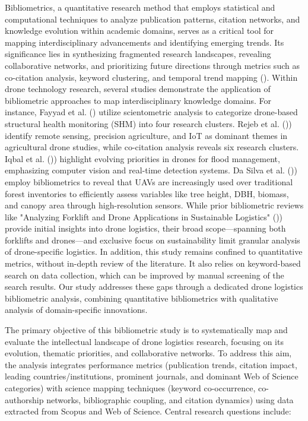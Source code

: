 \documentclass{article}
\begin{document}
Bibliometrics, a quantitative research method that employs statistical and computational techniques to analyze publication patterns, citation networks, and knowledge evolution within academic domains, serves as a critical tool for mapping interdisciplinary advancements and identifying emerging trends. Its significance lies in synthesizing fragmented research landscapes, revealing collaborative networks, and prioritizing future directions through metrics such as co-citation analysis, keyword clustering, and temporal trend mapping (\cite{WOS:000958189000001}). Within drone technology research, several studies demonstrate the application of bibliometric approaches to map interdisciplinary knowledge domains. For instance, Fayyad et al. (\cite{WOS:001229751500001}) utilize scientometric analysis to categorize drone-based structural health monitoring (SHM) into four research clusters.  Rejeb et al. (\cite{WOS:000830895100002})) identify remote sensing, precision agriculture, and IoT as dominant themes in agricultural drone studies, while co-citation analysis reveals six research clusters. Iqbal et al.  (\cite{WOS:000914960100001})) highlight evolving priorities in drones for flood management, emphasizing computer vision and real-time detection systems.  Da Silva et al.  (\cite{WOS:001366904300001})) employ bibliometrics to reveal that UAVs are increasingly used over traditional forest inventories to efficiently assess variables like tree height, DBH, biomass, and canopy area through high-resolution sensors. While prior bibliometric reviews like "Analyzing Forklift and Drone Applications in Sustainable Logistics" (\cite{WOS:001329532200078})) provide initial insights into drone logistics, their broad scope—spanning both forklifts and drones—and exclusive focus on sustainability limit granular analysis of drone-specific logistics. In addition, this study remains confined to quantitative metrics, without in-depth review of the literature. It also relies on keyword-based search on data collection, which can be improved by manual screening of the search results. Our study addresses these gaps through a dedicated drone logistics bibliometric analysis, combining quantitative bibliometrics with qualitative analysis of domain-specific innovations. 

The primary objective of this bibliometric study is to systematically map and evaluate the intellectual landscape of drone logistics research, focusing on its evolution, thematic priorities, and collaborative networks. To address this aim, the analysis integrates performance metrics (publication trends, citation impact, leading countries/institutions, prominent journals, and dominant Web of Science categories) with science mapping techniques (keyword co-occurrence, co-authorship networks, bibliographic coupling, and citation dynamics) using data extracted from Scopus and Web of Science. Central research questions include: 
\end{document}
